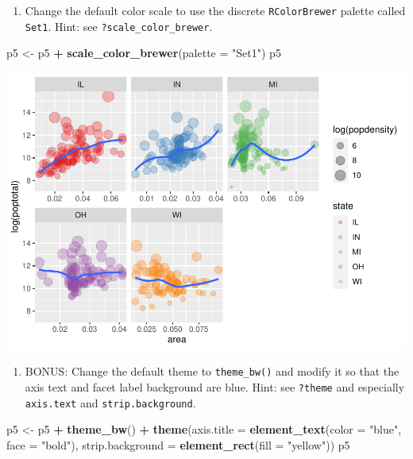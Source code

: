 \documentclass[
]{book}
\newenvironment{Shaded}{\begin{snugshade}}{\end{snugshade}}
\newcommand{\DataTypeTok}[1]{\textcolor[rgb]{0.13,0.29,0.53}{#1}}
\newcommand{\KeywordTok}[1]{\textcolor[rgb]{0.13,0.29,0.53}{\textbf{#1}}}
\newcommand{\NormalTok}[1]{#1}
\newcommand{\OperatorTok}[1]{\textcolor[rgb]{0.81,0.36,0.00}{\textbf{#1}}}
\newcommand{\StringTok}[1]{\textcolor[rgb]{0.31,0.60,0.02}{#1}}
\providecommand{\tightlist}{%
  \setlength{\itemsep}{0pt}\setlength{\parskip}{0pt}}
\begin{document}
\begin{alert}
\begin{enumerate}
\def\labelenumi{\arabic{enumi}.}
\setcounter{enumi}{4}
\tightlist
\item
  Change the default color scale to use the discrete \texttt{RColorBrewer} palette called \texttt{Set1}. Hint: see \texttt{?scale\_color\_brewer}.
\end{enumerate}

\begin{Shaded}
\begin{Highlighting}[]
\NormalTok{p5 \textless{}{-}}\StringTok{ }\NormalTok{p5 }\OperatorTok{+}\StringTok{ }\KeywordTok{scale\_color\_brewer}\NormalTok{(}\DataTypeTok{palette =} \StringTok{"Set1"}\NormalTok{)}
\NormalTok{p5}
\end{Highlighting}
\end{Shaded}

\includegraphics{R/Rgraphics/figures/unnamed-chunk-226-1.pdf}

\begin{enumerate}
\def\labelenumi{\arabic{enumi}.}
\setcounter{enumi}{5}
\tightlist
\item
  BONUS: Change the default theme to \texttt{theme\_bw()} and modify it so that the axis text and facet label background are blue. Hint: see \texttt{?theme} and especially \texttt{axis.text} and \texttt{strip.background}.
\end{enumerate}

\begin{Shaded}
\begin{Highlighting}[]
\NormalTok{p5 \textless{}{-}}\StringTok{ }\NormalTok{p5 }\OperatorTok{+}\StringTok{ }\KeywordTok{theme\_bw}\NormalTok{() }\OperatorTok{+}
\StringTok{    }\KeywordTok{theme}\NormalTok{(}\DataTypeTok{axis.title =} \KeywordTok{element\_text}\NormalTok{(}\DataTypeTok{color =} \StringTok{"blue"}\NormalTok{, }\DataTypeTok{face =} \StringTok{"bold"}\NormalTok{),}
          \DataTypeTok{strip.background =} \KeywordTok{element\_rect}\NormalTok{(}\DataTypeTok{fill =} \StringTok{"yellow"}\NormalTok{))}
\NormalTok{p5}
\end{Highlighting}
\end{Shaded}


\end{alert}
\end{document}
